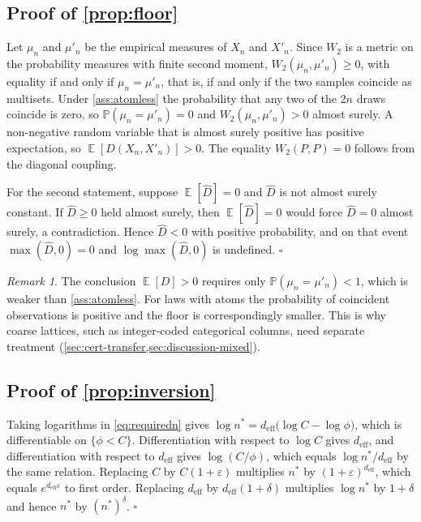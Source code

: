 \documentclass[twoside,11pt]{article}
\theoremstyle{plain}
\theoremstyle{definition}
\theoremstyle{remark}
\newtheorem{rem}{Remark}
\newcommand{\Wtwo}{\ensuremath{W_2}}
\newcommand{\deff}{\ensuremath{d_{\mathrm{eff}}}}
\DeclareMathOperator{\E}{\mathbb{E}}
\newcommand{\Prob}{\ensuremath{\mathbb{P}}}
\begin{document}
\subsection*{Proof of \cref{prop:floor}}

Let $\mu_n$ and $\mu'_n$ be the empirical measures of $X_n$ and $X'_n$.
Since $\Wtwo$ is a metric on the probability measures with finite second
moment, $\Wtwo(\mu_n, \mu'_n) \geq 0$, with equality if and only if
$\mu_n = \mu'_n$, that is, if and only if the two samples coincide as
multisets. Under \cref{ass:atomless} the probability that any two of the
$2n$ draws coincide is zero, so $\Prob(\mu_n = \mu'_n) = 0$ and
$\Wtwo(\mu_n, \mu'_n) > 0$ almost surely. A non-negative random variable that
is almost surely positive has positive expectation, so
$\E[D(X_n, X'_n)] > 0$. The equality $\Wtwo(P, P) = 0$ follows from the
diagonal coupling.

For the second statement, suppose $\E[\hat{D}] = 0$ and $\hat{D}$ is not
almost surely constant. If $\hat D \geq 0$ held almost surely, then
$\E[\hat D] = 0$ would force $\hat D = 0$ almost surely, a contradiction.
Hence $\hat{D} < 0$ with positive probability, and on that event
$\max(\hat{D}, 0) = 0$ and $\log \max(\hat{D}, 0)$ is undefined.
\hfill$\square$

\begin{rem}\label{rem:atoms}
The conclusion $\E[D] > 0$ requires only $\Prob(\mu_n = \mu'_n) < 1$, which
is weaker than \cref{ass:atomless}. For laws with atoms the probability of
coincident observations is positive and the floor is correspondingly
smaller. This is why coarse lattices, such as integer-coded categorical
columns, need separate treatment (\cref{sec:cert-transfer,sec:discussion-mixed}).
\end{rem}

\subsection*{Proof of \cref{prop:inversion}}

Taking logarithms in \cref{eq:requiredn} gives
$\log n^{*} = \deff \bigl(\log C - \log \phi\bigr)$, which is differentiable
on $\{\phi < C\}$. Differentiation with respect to $\log C$ gives $\deff$,
and differentiation with respect to $\deff$ gives $\log(C/\phi)$, which
equals $\log n^{*}/\deff$ by the same relation. Replacing $C$ by
$C(1 + \varepsilon)$ multiplies $n^{*}$ by $(1+\varepsilon)^{\deff}$, which
equals $e^{\deff \varepsilon}$ to first order. Replacing $\deff$ by
$\deff(1 + \delta)$ multiplies $\log n^{*}$ by $1 + \delta$ and hence $n^{*}$
by $(n^{*})^{\delta}$. \hfill$\square$
\end{document}
